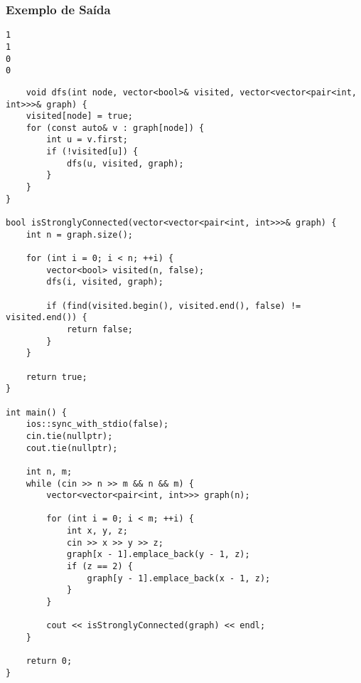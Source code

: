 \subsubsection*{Exemplo de Saída}
\begin{verbatim}
1
1
0
0
\end{verbatim}


\begin{lstlisting}
    void dfs(int node, vector<bool>& visited, vector<vector<pair<int, int>>>& graph) {
    visited[node] = true;
    for (const auto& v : graph[node]) {
        int u = v.first;
        if (!visited[u]) {
            dfs(u, visited, graph);
        }
    }
}

bool isStronglyConnected(vector<vector<pair<int, int>>>& graph) {
    int n = graph.size();

    for (int i = 0; i < n; ++i) {
        vector<bool> visited(n, false);
        dfs(i, visited, graph);

        if (find(visited.begin(), visited.end(), false) != visited.end()) {
            return false;
        }
    }

    return true;
}

int main() {
    ios::sync_with_stdio(false);
    cin.tie(nullptr);
    cout.tie(nullptr);

    int n, m;
    while (cin >> n >> m && n && m) {
        vector<vector<pair<int, int>>> graph(n);

        for (int i = 0; i < m; ++i) {
            int x, y, z;
            cin >> x >> y >> z;
            graph[x - 1].emplace_back(y - 1, z);
            if (z == 2) {
                graph[y - 1].emplace_back(x - 1, z);
            }
        }

        cout << isStronglyConnected(graph) << endl;
    }

    return 0;
}
\end{lstlisting}